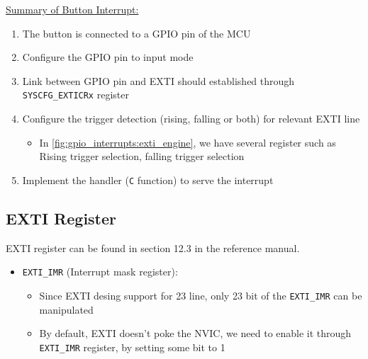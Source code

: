 \underline{Summary of Button Interrupt:}

\begin{enumerate}

\item The button is connected to a GPIO pin of the MCU

\item  Configure the GPIO pin to input mode

\item  Link between GPIO pin and EXTI should established through \verb|SYSCFG_EXTICRx| register

\item  Configure the trigger detection (rising, falling or both) for relevant EXTI line

    \begin{itemize}
        \item In \autoref{fig:gpio_interrupts:exti_engine}, we have several register such as Rising trigger selection, falling trigger selection
    \end{itemize}

\item Implement the handler (\verb|C| function) to serve the interrupt

\end{enumerate}

\subsection{EXTI Register}

EXTI register can be found in section 12.3 in the reference manual.

\begin{itemize}

\item \verb|EXTI_IMR| (Interrupt mask register):

    \begin{itemize}
    
        \item Since EXTI desing support for 23 line, only 23 bit of the \verb|EXTI_IMR| can be manipulated

        \item  By default, EXTI doesn't poke the NVIC, we need to enable it through \verb|EXTI_IMR| register, by setting some bit to 1
    
    \end{itemize}

\end{itemize}



